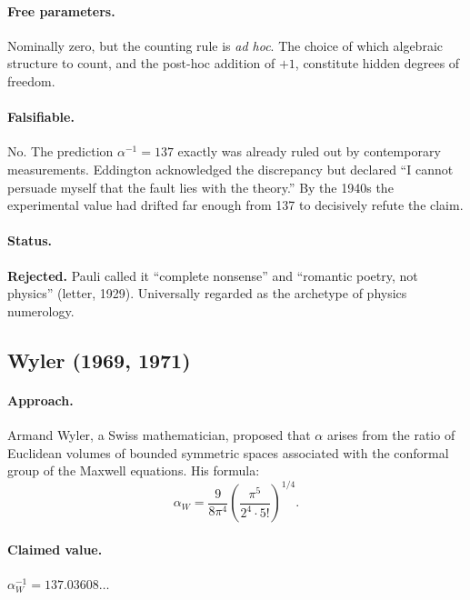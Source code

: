 \documentclass[11pt,a4paper]{article}
\begin{document}
\paragraph{Free parameters.}
Nominally zero, but the counting rule is \emph{ad hoc}.  The choice of which algebraic structure to count, and the post-hoc addition of $+1$, constitute hidden degrees of freedom.

\paragraph{Falsifiable.}
No.  The prediction $\alpha^{-1}=137$ exactly was already ruled out by contemporary measurements.  Eddington acknowledged the discrepancy but declared ``I cannot persuade myself that the fault lies with the theory.''  By the 1940s the experimental value had drifted far enough from 137 to decisively refute the claim.

\paragraph{Status.}
\textbf{Rejected.}  Pauli called it ``complete nonsense'' and ``romantic poetry, not physics'' (letter, 1929).  Universally regarded as the archetype of physics numerology.

\subsection{Wyler (1969, 1971)}\label{sec:wyler}

\paragraph{Approach.}
Armand Wyler, a Swiss mathematician, proposed that $\alpha$ arises from the ratio of Euclidean volumes of bounded symmetric spaces associated with the conformal group of the Maxwell equations.  His formula:
\begin{equation}
\alpha_W = \frac{9}{8\pi^4}\left(\frac{\pi^5}{2^4 \cdot 5!}\right)^{1/4}.
\end{equation}

\paragraph{Claimed value.}
$\alpha^{-1}_W = 137.03608\ldots$
\end{document}
